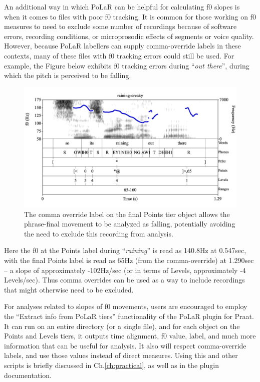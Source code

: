 \documentclass[11pt, twoside]{memoir}
\def\langtext#1{\textit{#1}}
\begin{document}
An additional way in which PoLaR can be helpful for calculating f0 slopes is when it comes to files with poor f0 tracking. It is common for those working on f0 measures to need to exclude some number of recordings because of software errors, recording conditions, or microprosodic effects of segments or voice quality. However, because PoLaR labellers can supply comma-override labels in these contexts, many of these files with f0 tracking errors could still be used. For example, the Figure below exhibits f0 tracking errors during “\langtext{out there}”, during which the pitch is perceived to be falling.

\begin{figure}[H]
\centering
%
\includegraphics[width=.875\linewidth]{Usages-raining-creaky.png}
%
\caption{The comma override label on the final Points tier object allows the phrase-final movement to be analyzed as falling, potentially avoiding the need to exclude this recording from analysis.%
\label{fig:Usages raining creaky}%
}
\end{figure}

Here the f0 at the Points label during “\langtext{raining}” is read as 140.8Hz at 0.547sec, with the final Points label is read as 65Hz (from the comma-override) at 1.290sec – a slope of approximately ​​-102Hz/sec (or in terms of Levels, approximately -4 Levels/sec). Thus comma overrides can be used as a way to include recordings that might otherwise need to be excluded.

\begin{infobox}
For analyses related to slopes of f0 movements, users are encouraged to employ the “Extract info from PoLaR tiers” functionality of the PoLaR plugin for Praat. It can run on an entire directory (or a single file), and for each object on the Points and Levels tiers, it outputs time alignment, f0 value, label, and much more information that can be useful for analysis. It also will respect comma-override labels, and use those values instead of direct measures. Using this and other scripts is briefly discussed in Ch.\ref{ch:practical}, as well as in the plugin documentation.	
\end{infobox}
\end{document}
